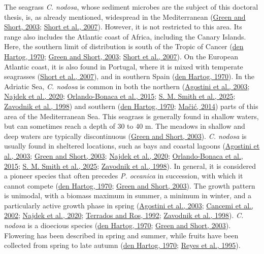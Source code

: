 \documentclass[
  12 pt,
]{book}
\begin{document}
The seagrass \emph{C. nodosa}, whose sediment microbes are the subject of this doctoral thesis, is, as already mentioned, widespread in the Mediterranean (\protect\hyperlink{ref-Green2003}{Green and Short, 2003}; \protect\hyperlink{ref-Short2007}{Short et al., 2007}). However, it is not restricted to this area. Its range also includes the Atlantic coast of Africa, including the Canary Islands. Here, the southern limit of distribution is south of the Tropic of Cancer (\protect\hyperlink{ref-denHartog1970}{den Hartog, 1970}; \protect\hyperlink{ref-Green2003}{Green and Short, 2003}; \protect\hyperlink{ref-Short2007}{Short et al., 2007}). On the European Atlantic coast, it is also found in Portugal, where it is mixed with temperate seagrasses (\protect\hyperlink{ref-Short2007}{Short et al., 2007}), and in southern Spain (\protect\hyperlink{ref-denHartog1970}{den Hartog, 1970}). In the Adriatic Sea, \emph{C. nodosa} is common in both the northern (\protect\hyperlink{ref-Agostini2003}{Agostini et al., 2003}; \protect\hyperlink{ref-Najdek2020a}{Najdek et al., 2020}; \protect\hyperlink{ref-Orlando-Bonaca2015}{Orlando-Bonaca et al., 2015}; \protect\hyperlink{ref-Smith2025}{S. M. Smith et al., 2025}; \protect\hyperlink{ref-Zavodnik1998}{Zavodnik et al., 1998}) and southern (\protect\hyperlink{ref-denHartog1970}{den Hartog, 1970}; \protect\hyperlink{ref-Macic2014}{Mačić, 2014}) parts of this area of the Mediterranean Sea. This seagrass is generally found in shallow waters, but can sometimes reach a depth of 30 to 40 \si{\m}. The meadows in shallow and deep waters are typically discontinuous (\protect\hyperlink{ref-Green2003}{Green and Short, 2003}). \emph{C. nodosa} is usually found in sheltered locations, such as bays and coastal lagoons (\protect\hyperlink{ref-Agostini2003}{Agostini et al., 2003}; \protect\hyperlink{ref-Green2003}{Green and Short, 2003}; \protect\hyperlink{ref-Najdek2020a}{Najdek et al., 2020}; \protect\hyperlink{ref-Orlando-Bonaca2015}{Orlando-Bonaca et al., 2015}; \protect\hyperlink{ref-Smith2025}{S. M. Smith et al., 2025}; \protect\hyperlink{ref-Zavodnik1998}{Zavodnik et al., 1998}). In general, it is considered a pioneer species that often precedes \emph{P. oceanica} in succession, with which it cannot compete (\protect\hyperlink{ref-denHartog1970}{den Hartog, 1970}; \protect\hyperlink{ref-Green2003}{Green and Short, 2003}). The growth pattern is unimodal, with a biomass maximum in summer, a minimum in winter, and a particularly active growth phase in spring (\protect\hyperlink{ref-Agostini2003}{Agostini et al., 2003}; \protect\hyperlink{ref-Cancemi2002}{Cancemi et al., 2002}; \protect\hyperlink{ref-Najdek2020a}{Najdek et al., 2020}; \protect\hyperlink{ref-Terrados1992}{Terrados and Ros, 1992}; \protect\hyperlink{ref-Zavodnik1998}{Zavodnik et al., 1998}). \emph{C. nodosa} is a dioecious species (\protect\hyperlink{ref-denHartog1970}{den Hartog, 1970}; \protect\hyperlink{ref-Green2003}{Green and Short, 2003}). Flowering has been described in spring and summer, while fruits have been collected from spring to late autumn (\protect\hyperlink{ref-denHartog1970}{den Hartog, 1970}; \protect\hyperlink{ref-Reyes1995}{Reyes et al., 1995}).
\end{document}
